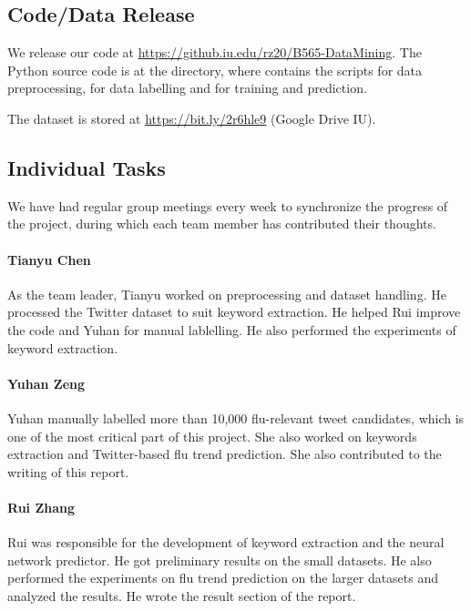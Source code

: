 \documentclass[12pt, oneside]{article}
\begin{document}
\subsection{Code/Data Release}

We release our code at \url{https://github.iu.edu/rz20/B565-DataMining}. The Python source code is at the  directory, where
 contains the scripts for data preprocessing,  for data labelling and  for training
and prediction.

The dataset is stored at \url{https://bit.ly/2r6hle9} (Google Drive IU).

\subsection{Individual Tasks}

We have had regular group meetings every week to synchronize the progress of the project, during which each team member has contributed their thoughts.

\paragraph{Tianyu Chen}
As the team leader, Tianyu worked on preprocessing and dataset handling. He processed the Twitter dataset to suit keyword extraction.
He helped Rui improve the code and Yuhan for manual lablelling. He also performed the experiments of keyword extraction.

\paragraph{Yuhan Zeng}
Yuhan manually labelled more than 10,000 flu-relevant tweet candidates, which is one of the most critical part of this project.
She also worked on keywords extraction and Twitter-based flu trend prediction. She also contributed to the writing of this report.

\paragraph{Rui Zhang}
Rui was responsible for the development of keyword extraction and the neural network predictor. He got preliminary results on the small datasets.
He also performed the experiments on flu trend prediction on the larger datasets and analyzed the results. He wrote the result section of the report.



\end{document}
